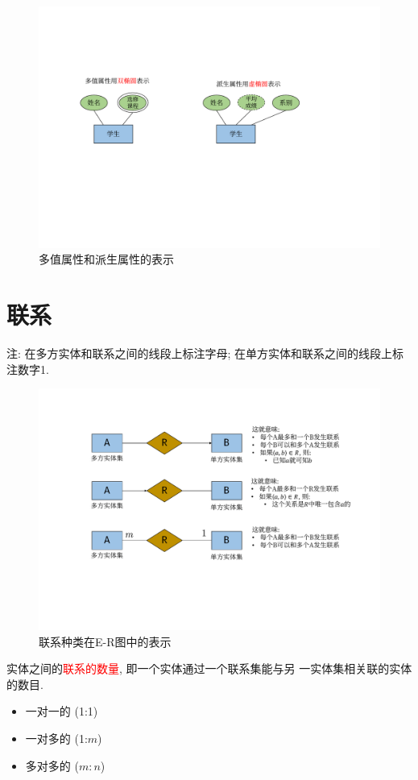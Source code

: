 \begin{figure}[H]
    \centering
    \includegraphics[width=.8\textwidth]{figure/多值属性和派生属性.pdf}
    \caption{多值属性和派生属性的表示}
\end{figure}

\section{联系}

注: 在多方实体和联系之间的线段上标注字母; 在单方实体和联系之间的线段上标注数字1.
\begin{figure}[H]
    \centering
    \includegraphics[width=.7\textwidth]{figure/联系.pdf}
    \caption{联系种类在E-R图中的表示}
\end{figure}

\begin{definition}[联系的数量]
    实体之间的\textcolor{red}{联系的数量}, 即一个实体通过一个联系集能与另
    一实体集相关联的实体的数目.
    \begin{itemize}
        \item 一对一的 (1:1)
        \item 一对多的 (1:$m$)
        \item 多对多的 ($m:n$)
    \end{itemize}
\end{definition}


